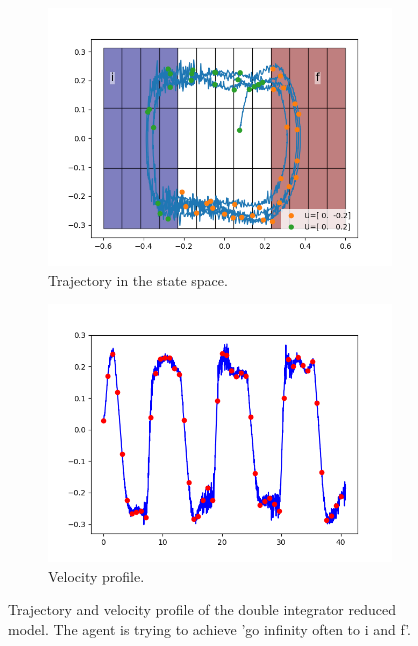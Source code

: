 \documentclass{article}
\theoremstyle{named}
\begin{document}
\begin{figure}[!ht]
	\begin{subfigure}[b]{0.5\textwidth}
  		\centering
  		\includegraphics[width=\linewidth]{double_reduced_1D}
	  	\caption{Trajectory in the state space.}
	  	\label{double_reduced_1D}
  \end{subfigure}
	\begin{subfigure}[b]{0.5\textwidth}
  		\centering
  		\includegraphics[width=\linewidth]{double_reduced_1D_vel}
	  	\caption{Velocity profile.}
	  	\label{double_reduced_1D_vel}
  \end{subfigure}
  \caption{Trajectory and velocity profile of the double integrator reduced model. The agent is trying to achieve 'go infinity often to i and f'.}
\end{figure}
\end{document}
